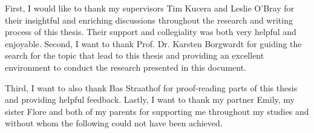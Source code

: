 First, I would like to thank my supervisors Tim Kucera and Leslie O'Bray for
their insightful and enriching discussions throughout the research and writing
process of this thesis. Their support and collegiality was both very helpful and
enjoyable. Second, I want to thank Prof. Dr. Karsten Borgwardt for guiding the
search for the topic that lead to this thesis and providing an excellent
environment to conduct the research presented in this document.

Third, I want to also thank Bas Straathof for proof-reading parts of this
thesis and providing helpful feedback. Lastly, I want to thank my partner Emily,
my sister Flore and both of my parents for supporting me throughout my studies and
without whom the following could not have been achieved.
